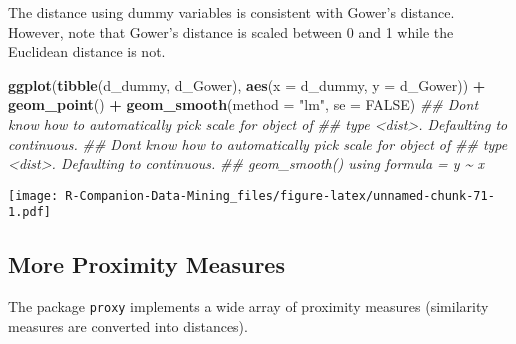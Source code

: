 \documentclass[
  notitlepage]{book}
\newenvironment{Shaded}{\begin{snugshade}}{\end{snugshade}}
\newcommand{\CommentTok}[1]{\textcolor[rgb]{0.56,0.35,0.01}{\textit{#1}}}
\newcommand{\DataTypeTok}[1]{\textcolor[rgb]{0.13,0.29,0.53}{#1}}
\newcommand{\KeywordTok}[1]{\textcolor[rgb]{0.13,0.29,0.53}{\textbf{#1}}}
\newcommand{\NormalTok}[1]{#1}
\newcommand{\OperatorTok}[1]{\textcolor[rgb]{0.81,0.36,0.00}{\textbf{#1}}}
\newcommand{\OtherTok}[1]{\textcolor[rgb]{0.56,0.35,0.01}{#1}}
\newcommand{\StringTok}[1]{\textcolor[rgb]{0.31,0.60,0.02}{#1}}
\begin{document}
The distance using dummy variables is consistent with Gower's distance.
However, note that Gower's distance is scaled between 0 and 1 while the
Euclidean distance is not.

\begin{Shaded}
\begin{Highlighting}[]
\KeywordTok{ggplot}\NormalTok{(}\KeywordTok{tibble}\NormalTok{(d\_dummy, d\_Gower), }\KeywordTok{aes}\NormalTok{(}\DataTypeTok{x =}\NormalTok{ d\_dummy, }\DataTypeTok{y =}\NormalTok{ d\_Gower)) }\OperatorTok{+}
\StringTok{  }\KeywordTok{geom\_point}\NormalTok{() }\OperatorTok{+}
\StringTok{  }\KeywordTok{geom\_smooth}\NormalTok{(}\DataTypeTok{method =} \StringTok{"lm"}\NormalTok{, }\DataTypeTok{se =} \OtherTok{FALSE}\NormalTok{)}
\CommentTok{\#\# Don\textquotesingle{}t know how to automatically pick scale for object of}
\CommentTok{\#\# type \textless{}dist\textgreater{}. Defaulting to continuous.}
\CommentTok{\#\# Don\textquotesingle{}t know how to automatically pick scale for object of}
\CommentTok{\#\# type \textless{}dist\textgreater{}. Defaulting to continuous.}
\CommentTok{\#\# \textasciigrave{}geom\_smooth()\textasciigrave{} using formula = \textquotesingle{}y \textasciitilde{} x\textquotesingle{}}
\end{Highlighting}
\end{Shaded}

\texttt{[image: R-Companion-Data-Mining\_files/figure-latex/unnamed-chunk-71-1.pdf]}

\hypertarget{more-proximity-measures}{%
\subsection{More Proximity Measures}\label{more-proximity-measures}}

The package \texttt{proxy} implements a wide array of proximity measures
(similarity measures are converted into distances).
\end{document}

